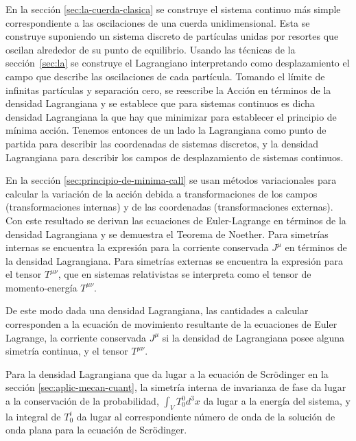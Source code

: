 En la sección \ref{sec:la-cuerda-clasica} se construye el sistema continuo más simple correspondiente a las oscilaciones de una cuerda unidimensional. Esta se construye suponiendo un sistema discreto de partículas unidas por resortes que oscilan alrededor de su punto de equilibrio. Usando las técnicas de la sección~\ref{sec:la} se construye el Lagrangiano interpretando como desplazamiento el campo que describe las oscilaciones de cada partícula. Tomando el límite de infinitas partículas y separación cero, se reescribe la Acción en términos de la densidad Lagrangiana y se establece que para sistemas continuos es dicha densidad Lagrangiana la que hay que minimizar para establecer el principio de mínima acción. Tenemos entonces de un lado la Lagrangiana como punto de partida para describir las coordenadas de sistemas discretos, y la densidad Lagrangiana para describir los campos de desplazamiento de sistemas continuos. 

En la sección \ref{sec:principio-de-minima-call} se usan métodos variacionales para calcular la variación de la acción debida a transformaciones de los campos (transformaciones internas) y de las coordenadas (transformaciones externas). Con este resultado se derivan las ecuaciones de Euler-Lagrange en términos de la densidad Lagrangiana y se demuestra el  Teorema de Noether. Para simetrías internas se encuentra la expresión para la corriente conservada $J^\mu$ en términos de la densidad Lagrangiana. Para simetrías externas se encuentra la expresión para el tensor $T^{\mu\nu}$, que en sistemas relativistas se interpreta como el tensor de momento-energía $T^{\mu\nu}$. 

De este modo dada una densidad Lagrangiana, las cantidades a calcular corresponden a la ecuación de movimiento resultante de la ecuaciones de Euler Lagrange, la corriente conservada $J^\mu$ si la densidad de Lagrangiana posee alguna simetría continua, y el tensor $T^{\mu\nu}$. 

Para la densidad Lagrangiana que da lugar a la ecuación de Scr\"odinger en la sección \ref{sec:aplic-mecan-cuant}, la simetría interna de invarianza de fase da lugar a la conservación de la probabilidad, $\int_V T^0_0 d^3x$ da lugar a la energía del sistema, y la integral de $T^i_0$ da lugar al correspondiente número de onda de la solución de onda plana para la ecuación de Scr\"odinger.

